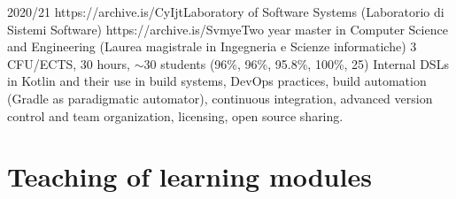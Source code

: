 \begin{outerlist}
    \item[2020/21]
        \unibocourse
        {https://archive.is/CyIjt}{Laboratory of Software Systems (Laboratorio di Sistemi Software)}
        {https://archive.is/Svmye}{Two year master in Computer Science and Engineering (Laurea magistrale in Ingegneria e Scienze informatiche)}
        {3 CFU/ECTS, 30 hours, $\sim$30 students}
        {(96\%, 96\%, 95.8\%, 100\%, 25)}
        {Internal DSLs in Kotlin and their use in build systems, DevOps practices, build automation (Gradle as paradigmatic automator), continuous integration, advanced version control and team organization, licensing, open source sharing.}
\end{outerlist}

\section{Teaching of learning modules}
\vspace{-1.9em}
\newcommand{\oopjava}{Practical OOP programming in Java from simple examples to advanced mechanisms and design patterns, including parallel and functional-like programming; basics of quality assurance, profiling, and build automation; distributed version control.}
\newcommand{\sedtmeit}{DevOps: Principles, practices, and tools; agile development and SCRUM; testing; continuous integration and delivery.}
